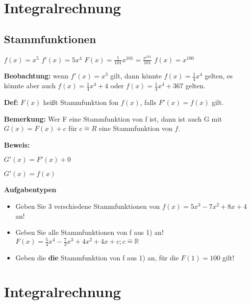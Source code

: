 \documentclass{article}
\begin{document}
\section*{Integralrechnung}

\subsection*{Stammfunktionen}

$f(x) = x^5$
\newline
$f'(x) = 5x^4$
\newline
\newline
$F(x) = \frac{1}{101}x^{101} = \frac{x^{101}}{101}$
\newline
$f(x) = x^{100}$
\newline
\newline

\noindent \textbf{Beobachtung:} wenn $f'(x) = x^3$ gilt, dann könnte $f(x) = \frac{1}{4}x^4$ gelten, es könnte aber auch $f(x) = \frac{1}{4}x^4 + 4$ oder $f(x) = \frac{1}{4}x^4 + 367$ gelten.
\vspace{0.5cm}

\noindent \textbf{Def:} $F(x)$ heißt Stammfunktion fon $f(x)$, falls $F'(x) = f(x)$ gilt.
\vspace{0.5cm}

\noindent \textbf{Bemerkung:} Wer F eine Stammfunktion von f ist, dann ist auch G mit $G(x) = F(x) + c$ für $c \widehat{=} R$ eine Stammfunktion von $f$.
\vspace{0.5cm}

\noindent \textbf{Beweis:} 

$G'(x) = F'(x) + 0$  

$G'(x) = f(x)$
\vspace{0.5cm}

\noindent \textbf{Aufgabentypen}

\begin{itemize}
\item Geben Sie 3 verschiedene Stammfunktionen von $f(x) = 5x^3 - 7x^2 + 8x + 4$ an!
\item Geben Sie alle Stammfunktionen von f aus 1) an! \newline $F(x) = \frac{5}{4} x^4 - \frac{7}{3}x^3 + 4x^2 + 4x + c; c \widehat{=} \mathbb{R}$
\item Geben die \textbf{die} Stammfunktion von f aus 1) an, für die $F(1) = 100$ gilt!
\end{itemize}

\section*{Integralrechnung}
\end{document}
